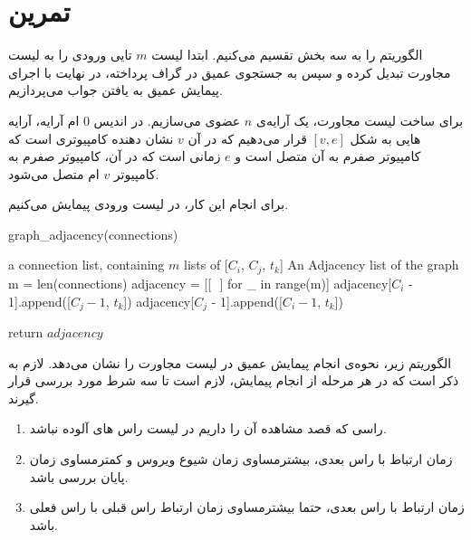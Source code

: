 \documentclass{article}
\begin{document}
\pagebreak
\section{تمرین}
الگوریتم را به سه بخش تقسیم می‌کنیم. ابتدا لیست
$m$
تایی ورودی را به لیست مجاورت تبدیل کرده و سپس به جستجوی عمیق در گراف پرداخته، در نهایت با اجرای پیمایش عمیق به یافتن جواب می‌پردازیم.

برای ساخت لیست مجاورت، یک آرایه‌ی
$n$
عضوی می‌سازیم. 
در اندیس
$0$
ام آرایه، آرایه هایی به شکل
$[v, e]$
قرار می‌دهیم که در آن 
$v$
نشان دهنده کامپیوتری است که کامپیوتر صفرم به آن متصل است و
$e$
زمانی است که در آن، کامپیوتر صفرم به کامپیوتر
$v$ ام 
متصل می‌شود.

برای انجام این کار، در لیست ورودی پیمایش می‌کنیم.
\begin{latin}
    \begin{algorithm}[H]
    \caption{graph\_adjacency(connections)}
        \begin{algorithmic}
            \Require a connection list, containing $m$ lists of [$C_i$, $C_j$, $t_k$]
            \Ensure An Adjacency list of the graph
            \State m = len(connections)
            \State adjacency = [[\, \,] for \_ in range(m)]
                \State adjacency[$C_i$ - 1].append([$C_j - 1$, $t_k$])
                \State adjacency[$C_j$ - 1].append([$C_i - 1$, $t_k$])
                
            \EndFor
            \State return $adjacency$
        \end{algorithmic}
    \end{algorithm}
\end{latin}



الگوریتم زیر، نحوه‌ی انجام پیمایش عمیق در لیست مجاورت را نشان می‌دهد.
لازم به ذکر است که در هر مرحله از انجام پیمایش، لازم است تا سه شرط مورد بررسی قرار گیرند.
\begin{enumerate}
    \item 
    راسی که قصد مشاهده آن را داریم در لیست راس های آلوده نباشد.
    \item 
    زمان ارتباط با راس بعدی، بیشترمساوی زمان شیوع ویروس و کمترمساوی زمان پایان بررسی باشد.
    \item 
    زمان ارتباط با راس بعدی، حتما بیشترمساوی زمان ارتباط راس قبلی با راس فعلی باشد.‌
\end{enumerate}
\end{document}
